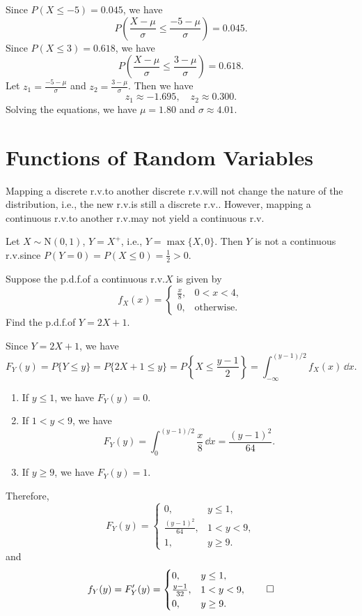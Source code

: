\begin{solution}
  Since \(P(X \leq -5) = 0.045\), we have
  \[
    P\!\left(\frac{X - \mu}{\sigma} \leq \frac{-5 - \mu}{\sigma}\right) = 0.045.
  \]
  Since \(P(X \leq 3) = 0.618\), we have
  \[
    P\!\left(\frac{X - \mu}{\sigma} \leq \frac{3 - \mu}{\sigma}\right) = 0.618.
  \]
  Let \(z_1 = \frac{-5 - \mu}{\sigma}\) and \(z_2 = \frac{3 - \mu}{\sigma}\). Then we have
  \[
    z_1 \approx -1.695, \quad z_2 \approx 0.300.
  \]
  Solving the equations, we have \(\mu = 1.80\) and \(\sigma \approx 4.01\).
\end{solution}

\section{Functions of Random Variables}

Mapping a discrete r.v.\@ to another discrete r.v.\@ will not change the nature of the distribution, i.e., the new r.v.\@ is still a discrete r.v.\@. However, mapping a continuous r.v.\@ to another r.v.\@ may not yield a continuous r.v.
\begin{example}
  Let \(X \sim \mathrm{N}(0, 1)\), \(Y = X^+\), i.e., \(Y = \max\{X, 0\}\). Then \(Y\) is not a continuous r.v.\@ since \(P(Y = 0) = P(X \leq 0) = \frac{1}{2} > 0\).
\end{example}
\begin{example}
  Suppose the p.d.f.\@ of a continuous r.v.\@ \(X\) is given by
  \[
    f_X(x) = \begin{cases}
      \frac{x}{8}, & 0 < x < 4, \\
      0, & \text{otherwise}.
    \end{cases}
  \]
  Find the p.d.f.\@ of \(Y = 2X + 1\).
\end{example}
\begin{solution}
  Since \(Y = 2X + 1\), we have
  \[
    F_Y(y) = P\{Y \leq y\} = P\{2X + 1 \leq y\} = P\left\{X \leq \frac{y - 1}{2}\right\} = \int_{-\infty}^{(y - 1)/2} f_X(x)\,\dd x.
  \]
  \begin{enumerate}
    \item If \(y \leq 1\), we have \(F_Y(y) = 0\).
    \item If \(1 < y < 9\), we have
    \[
      F_Y(y) = \int_0^{(y - 1)/2} \frac{x}{8}\,\dd x = \frac{(y - 1)^2}{64}.
    \]
    \item If \(y \geq 9\), we have \(F_Y(y) = 1\).
  \end{enumerate}
  Therefore,
  \[
    F_Y(y) = \begin{cases}
      0, & y \leq 1, \\
      \frac{(y - 1)^2}{64}, & 1 < y < 9, \\
      1, & y \geq 9.
    \end{cases}
  \]
  and
  \[
    f_Y(y) = F_Y'(y) = \begin{cases}
      0, & y \leq 1, \\
      \frac{y - 1}{32}, & 1 < y < 9, \\
      0, & y \geq 9.
    \end{cases} \qedhere
  \]
\end{solution}


